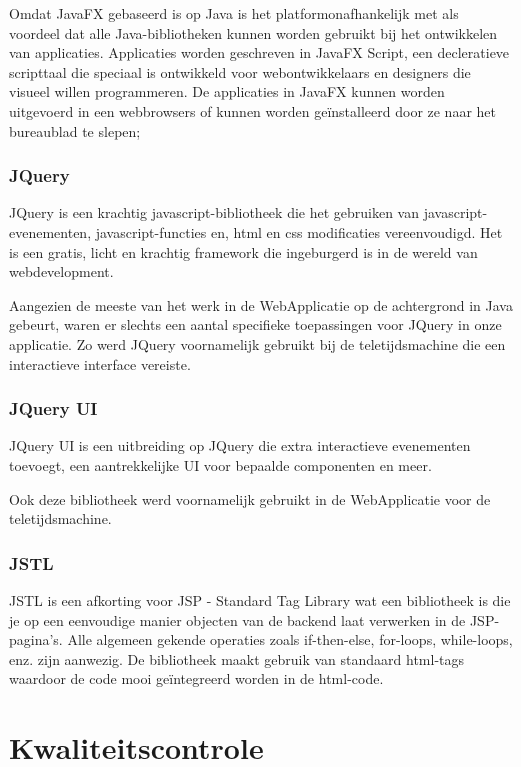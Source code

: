 \documentclass[pdftex,a4paper,12pt,twoside]{report}
\begin{document}
Omdat JavaFX gebaseerd is op Java is het platformonafhankelijk met als voordeel dat alle Java-bibliotheken kunnen worden gebruikt bij het ontwikkelen van applicaties.
Applicaties worden geschreven in JavaFX Script, een decleratieve scripttaal die speciaal is ontwikkeld voor webontwikkelaars en designers die visueel willen programmeren. 
De applicaties in JavaFX kunnen worden uitgevoerd in een webbrowsers of kunnen worden geïnstalleerd  door ze naar het bureaublad  te slepen;

\subsection{JQuery}
JQuery is een krachtig javascript-bibliotheek die het gebruiken van javascript-evenementen, javascript-functies en, html en css modificaties vereenvoudigd. Het is een gratis, licht en krachtig framework die ingeburgerd is in de wereld van webdevelopment.

Aangezien de meeste van het werk in de WebApplicatie op de achtergrond in Java gebeurt, waren er slechts een aantal specifieke toepassingen voor JQuery in onze applicatie. Zo werd JQuery voornamelijk gebruikt bij de teletijdsmachine die een interactieve interface vereiste.


\subsection{JQuery UI}
JQuery UI is een uitbreiding op JQuery die extra interactieve evenementen toevoegt, een aantrekkelijke UI voor bepaalde componenten en meer.

Ook deze bibliotheek werd voornamelijk gebruikt in de WebApplicatie voor de teletijdsmachine.


\subsection{JSTL}
JSTL is een afkorting voor JSP - Standard Tag Library wat een bibliotheek is die je op een eenvoudige manier objecten van de backend laat verwerken in de JSP-pagina's. Alle algemeen gekende operaties zoals if-then-else, for-loops, while-loops, enz. zijn aanwezig. De bibliotheek maakt gebruik van standaard html-tags waardoor de code mooi geïntegreerd worden in de html-code.

 
 \chapter{Kwaliteitscontrole}
 
\end{document}
